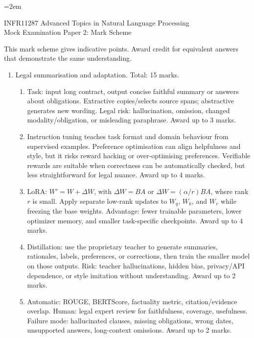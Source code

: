 \documentclass[11pt,a4paper]{article}
\begin{document}
\emergencystretch=2em

\begin{center}
{\Large INFR11287 Advanced Topics in Natural Language Processing}\\[0.5em]
{\Large Mock Examination Paper 2: Mark Scheme}\\[1em]
\end{center}

\noindent This mark scheme gives indicative points. Award credit for equivalent answers that demonstrate the same understanding.

\begin{enumerate}[leftmargin=*]
\item Legal summarisation and adaptation. Total: 15 marks.
\begin{enumerate}
\item Task: input long contract, output concise faithful summary or answers about obligations. Extractive copies/selects source spans; abstractive generates new wording. Legal risk: hallucination, omission, changed modality/obligation, or misleading paraphrase. Award up to 3 marks.
\item Instruction tuning teaches task format and domain behaviour from supervised examples. Preference optimisation can align helpfulness and style, but it risks reward hacking or over-optimising preferences. Verifiable rewards are suitable when correctness can be automatically checked, but less straightforward for legal nuance. Award up to 4 marks.
\item LoRA: \(W' = W + \Delta W\), with \(\Delta W = BA\) or \(\Delta W = (\alpha/r)BA\), where rank \(r\) is small. Apply separate low-rank updates to \(W_q\), \(W_k\), and \(W_v\) while freezing the base weights. Advantage: fewer trainable parameters, lower optimizer memory, and smaller task-specific checkpoints. Award up to 4 marks.
\item Distillation: use the proprietary teacher to generate summaries, rationales, labels, preferences, or corrections, then train the smaller model on those outputs. Risk: teacher hallucinations, hidden bias, privacy/API dependence, or style imitation without understanding. Award up to 2 marks.
\item Automatic: ROUGE, BERTScore, factuality metric, citation/evidence overlap. Human: legal expert review for faithfulness, coverage, usefulness. Failure mode: hallucinated clauses, missing obligations, wrong dates, unsupported answers, long-context omissions. Award up to 2 marks.
\end{enumerate}


\end{enumerate}
\end{document}
